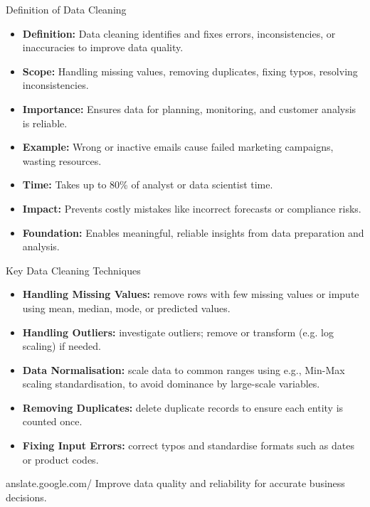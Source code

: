 \documentclass[aspectratio=169, table]{beamer}
\begin{document}
\begin{frame}{Definition of Data Cleaning}
	\vspace{20pt}
	
	\begin{itemize}
		\item \textbf{Definition:} Data cleaning identifies and fixes errors, inconsistencies, or inaccuracies to improve data quality.
		
		\item \textbf{Scope:} Handling missing values, removing duplicates, fixing typos, resolving inconsistencies.
		
		\item \textbf{Importance:} Ensures data for planning, monitoring, and customer analysis is reliable.
		
		\item \textbf{Example:} Wrong or inactive emails cause failed marketing campaigns, wasting resources.
		
		\item \textbf{Time:} Takes up to 80\% of analyst or data scientist time.
		
		\item \textbf{Impact:} Prevents costly mistakes like incorrect forecasts or compliance risks.
		
		\item \textbf{Foundation:} Enables meaningful, reliable insights from data preparation and analysis.
	\end{itemize}
	
\end{frame}

\begin{frame}{Key Data Cleaning Techniques}
	\vspace{20pt}
	
	\begin{itemize}
		\item \textbf{Handling Missing Values:} remove rows with few missing values or impute using mean, median, mode, or predicted values.
		
		\item \textbf{Handling Outliers:} investigate outliers; remove or transform (e.g. log scaling) if needed.
		
		\item \textbf{Data Normalisation:} scale data to common ranges using e.g., Min-Max scaling standardisation, to avoid dominance by large-scale variables.
		
		\item \textbf{Removing Duplicates:} delete duplicate records to ensure each entity is counted once.
		
		\item \textbf{Fixing Input Errors:} correct typos and standardise formats such as dates or product codes.
		
		
	\end{itemize}anslate.google.com/
	Improve data quality and reliability for accurate business decisions.
	
\end{frame}
\end{document}
